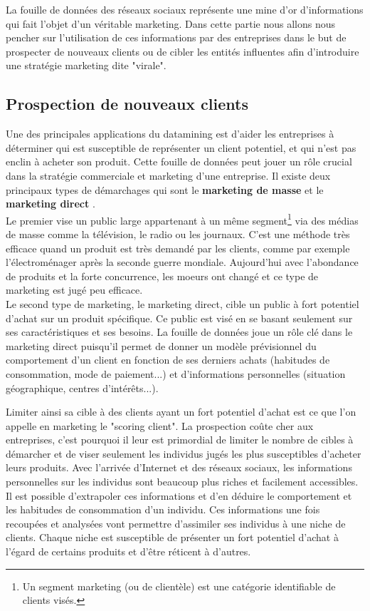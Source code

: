 La fouille de données des réseaux sociaux représente une mine d'or d'informations qui fait l'objet d'un véritable marketing. Dans cette partie nous allons nous pencher sur l'utilisation de ces informations par des entreprises dans le but de prospecter de nouveaux clients ou de cibler les entités influentes afin d'introduire une stratégie marketing dite "virale".

\subsection{Prospection de nouveaux clients}
Une des principales applications du datamining est d'aider les entreprises à déterminer qui est susceptible de représenter un client potentiel, et qui n'est pas enclin à acheter son produit. Cette fouille de données peut jouer un rôle crucial dans la stratégie commerciale et marketing d'une entreprise. Il existe deux principaux types de démarchages qui sont le \textbf{marketing de masse} et le \textbf{marketing direct} \cite{MarketMasseDirect}.\\
Le premier vise un public large appartenant à un même segment\footnote{Un segment marketing (ou de clientèle) est une catégorie identifiable de clients visés.} via des médias de masse comme la télévision, le radio ou les journaux. C'est une méthode très efficace quand un produit est très demandé par les clients, comme par exemple l'électroménager après la seconde guerre mondiale. Aujourd'hui avec l'abondance de produits et la forte concurrence, les moeurs ont changé et ce type de marketing est jugé peu efficace.\\
Le second type de marketing, le marketing direct, cible un public à fort potentiel d'achat sur un produit spécifique. Ce public est visé en se basant seulement sur ses caractéristiques et ses besoins. La fouille de données joue un rôle clé dans le marketing direct puisqu'il permet de donner un modèle prévisionnel du comportement d'un client en fonction de ses derniers achats (habitudes de consommation, mode de paiement...) et d'informations personnelles (situation géographique, centres d'intérêts...).

Limiter ainsi sa cible à des clients ayant un fort potentiel d'achat est ce que l'on appelle en marketing le "scoring client". La prospection coûte cher aux entreprises, c'est pourquoi il leur est primordial de limiter le nombre de cibles à démarcher et de viser seulement les individus jugés les plus susceptibles d'acheter leurs produits. Avec l'arrivée d'Internet et des réseaux sociaux, les informations personnelles sur les individus sont beaucoup plus riches et facilement accessibles. Il est possible d'extrapoler ces informations et d'en déduire le comportement et les habitudes de consommation d'un individu. Ces informations une fois recoupées et analysées vont permettre d'assimiler ses individus à une niche de clients. Chaque niche est susceptible de présenter un fort potentiel d'achat à l'égard de certains produits et d'être réticent à d'autres.

